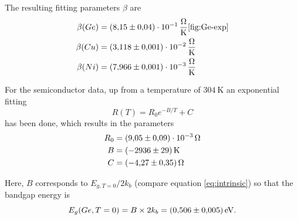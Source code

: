 The resulting fitting parameters $\beta$ are
\begin{align*}
    \beta(Ge) &= \SI{8.15 \pm 0.04 e-1}{\ohm\per\kelvin} \ref{fig:Ge-exp}\\
    \beta(Cu) &= \SI{3.118 \pm 0.001 e-2}{\ohm\per\kelvin} \\
    \beta(Ni) &= \SI{7.966 \pm 0.001 e-3}{\ohm\per\kelvin} \\
\end{align*}\label{equ:results-beta}

For the semiconductor data, up from a temperature of $\SI{304}{\kelvin}$ an exponential fitting 
\begin{equation}
    R(T) = R_0 e^{-B/T} + C
\end{equation}
has been done, which results in the parameters
\begin{align*}
    R_0 &= \SI{9.05 \pm 0.09 e-3}{\ohm} \\
    B &= \SI{-2936 \pm 29 }{\kelvin} \\
    C &= \SI{-4.27 \pm 0.35 }{\ohm} \\
\end{align*} 

Here, $B$ corresponds to $E_{g,T=0}/2k_b$ (compare equation \ref{eq:intrinsic}) so that the bandgap energy is
\begin{equation}
E_g(Ge,T=0) = B \times 2 k_b = \SI{0.506 \pm 0.005 }{\eV}.
\end{equation}\label{eq:bandgap-exp}

